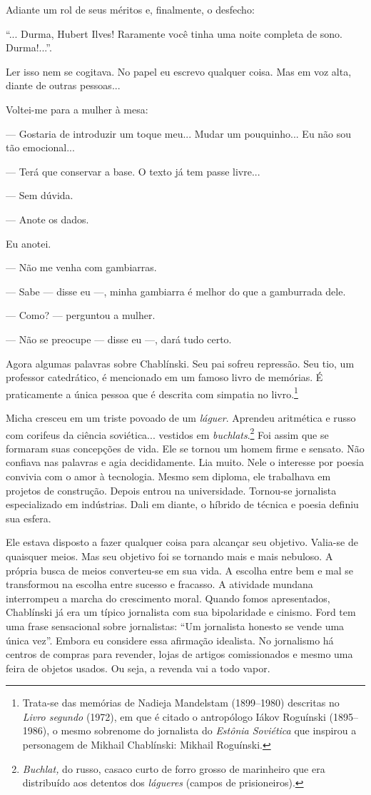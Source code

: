 Adiante um rol de seus méritos e, finalmente, o desfecho:

``... Durma, Hubert Ilves! Raramente você tinha uma noite completa de
sono. Durma!...''.

Ler isso nem se cogitava. No papel eu escrevo qualquer coisa. Mas em voz
alta, diante de outras pessoas...

Voltei-me para a mulher à mesa:

--- Gostaria de introduzir um toque meu... Mudar um pouquinho... Eu não
sou tão emocional...

--- Terá que conservar a base. O texto já tem passe livre...

--- Sem dúvida.

--- Anote os dados.

Eu anotei.

--- Não me venha com gambiarras.

--- Sabe --- disse eu ---, minha gambiarra é melhor do que a gamburrada
dele.

--- Como? --- perguntou a mulher.

--- Não se preocupe --- disse eu ---, dará tudo certo.

Agora algumas palavras sobre Chablínski. Seu pai sofreu repressão. Seu
tio, um professor catedrático, é mencionado em um famoso livro de
memórias. É praticamente a única pessoa que é descrita com simpatia no
livro.\footnote{Trata-se das memórias de Nadieja Mandelstam (1899--1980)
  descritas no \emph{Livro segundo} (1972), em que é citado o
  antropólogo Iákov Roguínski (1895--1986), o mesmo sobrenome do
  jornalista do \emph{Estônia Soviética} que inspirou a personagem de
  Mikhail Chablínski: Mikhail Roguínski.}

Micha cresceu em um triste povoado de um \emph{láguer}. Aprendeu
aritmética e russo com corifeus da ciência soviética... vestidos em
\emph{buchlats}.\footnote{\emph{Buchlat,} do russo, casaco curto de
  forro grosso de marinheiro que era distribuído aos detentos dos
  \emph{lágueres} (campos de prisioneiros).} Foi assim que se formaram
suas concepções de vida. Ele se tornou um homem firme e sensato. Não
confiava nas palavras e agia decididamente. Lia muito. Nele o interesse
por poesia convivia com o amor à tecnologia. Mesmo sem diploma, ele
trabalhava em projetos de construção. Depois entrou na universidade.
Tornou-se jornalista especializado em indústrias. Dali em diante, o
híbrido de técnica e poesia definiu sua esfera.

Ele estava disposto a fazer qualquer coisa para alcançar seu objetivo.
Valia-se de quaisquer meios. Mas seu objetivo foi se tornando mais e
mais nebuloso. A própria busca de meios converteu-se em sua vida. A
escolha entre bem e mal se transformou na escolha entre sucesso e
fracasso. A atividade mundana interrompeu a marcha do crescimento moral.
Quando fomos apresentados, Chablínski já era um típico jornalista com
sua bipolaridade e cinismo. Ford tem uma frase sensacional sobre
jornalistas: ``Um jornalista honesto se vende uma única vez''. Embora eu
considere essa afirmação idealista. No jornalismo há centros de compras
para revender, lojas de artigos comissionados e mesmo uma feira de
objetos usados. Ou seja, a revenda vai a todo vapor.

